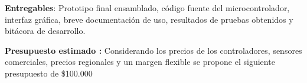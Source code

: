 \documentclass[a4paper,12pt]{article}
\begin{document}
\textbf{Entregables}: 
Prototipo final ensamblado, código fuente del microcontrolador, interfaz gráfica, breve documentación de uso, resultados de pruebas obtenidos y bitácora de desarrollo. \newline

\textbf{Presupuesto estimado :} Considerando los precios de los controladores, sensores comerciales, precios regionales y un margen flexible se propone el siguiente presupuesto de   \$100.000
\end{document}
